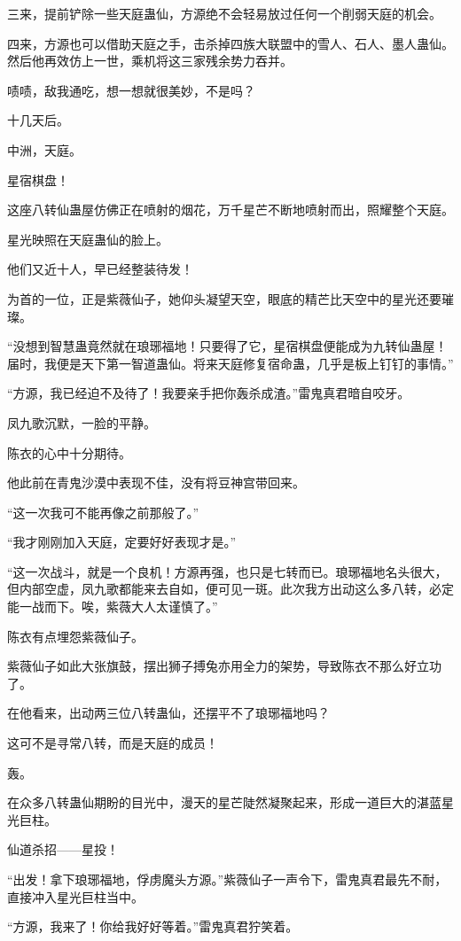 \begin{this_body}
三来，提前铲除一些天庭蛊仙，方源绝不会轻易放过任何一个削弱天庭的机会。

四来，方源也可以借助天庭之手，击杀掉四族大联盟中的雪人、石人、墨人蛊仙。然后他再效仿上一世，乘机将这三家残余势力吞并。

啧啧，敌我通吃，想一想就很美妙，不是吗？

十几天后。

中洲，天庭。

星宿棋盘！

这座八转仙蛊屋仿佛正在喷射的烟花，万千星芒不断地喷射而出，照耀整个天庭。

星光映照在天庭蛊仙的脸上。

他们又近十人，早已经整装待发！

为首的一位，正是紫薇仙子，她仰头凝望天空，眼底的精芒比天空中的星光还要璀璨。

“没想到智慧蛊竟然就在琅琊福地！只要得了它，星宿棋盘便能成为九转仙蛊屋！届时，我便是天下第一智道蛊仙。将来天庭修复宿命蛊，几乎是板上钉钉的事情。”

“方源，我已经迫不及待了！我要亲手把你轰杀成渣。”雷鬼真君暗自咬牙。

凤九歌沉默，一脸的平静。

陈衣的心中十分期待。

他此前在青鬼沙漠中表现不佳，没有将豆神宫带回来。

“这一次我可不能再像之前那般了。”

“我才刚刚加入天庭，定要好好表现才是。”

“这一次战斗，就是一个良机！方源再强，也只是七转而已。琅琊福地名头很大，但内部空虚，凤九歌都能来去自如，便可见一斑。此次我方出动这么多八转，必定能一战而下。唉，紫薇大人太谨慎了。”

陈衣有点埋怨紫薇仙子。

紫薇仙子如此大张旗鼓，摆出狮子搏兔亦用全力的架势，导致陈衣不那么好立功了。

在他看来，出动两三位八转蛊仙，还摆平不了琅琊福地吗？

这可不是寻常八转，而是天庭的成员！

轰。

在众多八转蛊仙期盼的目光中，漫天的星芒陡然凝聚起来，形成一道巨大的湛蓝星光巨柱。

仙道杀招——星投！

“出发！拿下琅琊福地，俘虏魔头方源。”紫薇仙子一声令下，雷鬼真君最先不耐，直接冲入星光巨柱当中。

“方源，我来了！你给我好好等着。”雷鬼真君狞笑着。

\end{this_body}


